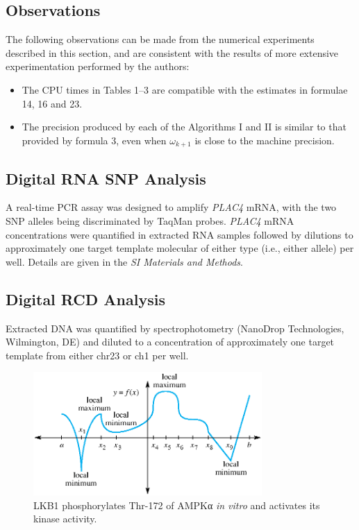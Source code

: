 \documentclass{pnas}
\begin{document}
\subsection{Observations}
The following observations can be made from the numerical experiments described in this section, and are consistent with the results of more extensive experimentation performed by the authors:
\begin{itemize}
\item The CPU times in Tables 1--3 are compatible with the estimates in formulae 14, 16 and 23.
\item The precision produced by each of the Algorithms I and II is similar to that provided by formula 3, even when \( ω_{k+1} \) is close to the machine precision.
\end{itemize}


\materialsstart
\subsection{Digital RNA SNP Analysis}
A real-time PCR assay was designed to amplify \emph{PLAC4} mRNA, with the two SNP alleles being discriminated by TaqMan probes.
\emph{PLAC4} mRNA concentrations were quantified in extracted RNA samples followed by dilutions to approximately one target template molecular of either type (i.e., either allele) per well. Details are given in the \emph{SI Materials and Methods}.

\subsection{Digital RCD Analysis}
Extracted DNA was quantified by spectrophotometry (NanoDrop Technologies, Wilmington, DE) and diluted to a concentration of approximately one target template from either chr23 or ch1 per well.


\materialsend


\nocite{*}
\printbibliography


\begin{figure}
\includegraphics[width=8.7cm]{figsamp.eps}
\caption{LKB1 phosphorylates Thr-172 of AMPKα \textit{in vitro}
and activates its kinase activity.}\label{afoto}
\end{figure}
\end{document}
